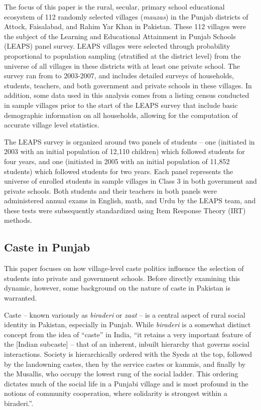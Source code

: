 \documentclass[Eubank_pk_ethnic_sorting.tex]{subfiles}
\begin{document}
The focus of this paper is the rural, secular, primary school educational ecosystem of 112 randomly selected villages (\emph{mauzas}) in the Punjab districts of Attock, Faisalabad, and Rahim Yar Khan in Pakistan. These 112 villages were the subject of the Learning and Educational Attainment in Punjab Schools (LEAPS) panel survey. LEAPS villages were selected through probability proportional to population sampling (stratified at the district level) from the universe of all villages in these districts with at least one private school. The survey ran from to 2003-2007, and includes detailed surveys of households, students, teachers, and both government and private schools in these villages. In addition, some data used in this analysis comes from a listing census conducted in sample villages prior to the start of the LEAPS survey that include basic demographic information on all households, allowing for the computation of accurate village level statistics.

The LEAPS survey is organized around two panels of students -- one (initiated in 2003 with an initial population of 12,110 children) which followed students for four years, and one (initiated in 2005 with an initial population of 11,852 students) which followed students for two years. Each panel represents the universe of enrolled students in sample villages in Class 3 in both government and private schools. Both students and their teachers in both panels were administered annual exams in English, math, and Urdu by the LEAPS team, and these tests were subsequently standardized using Item Response Theory (IRT) methods. 

\subsection{Caste in Punjab}\label{}

This paper focuses on how village-level caste politics influence the selection of students into private and government schools. Before directly examining this dynamic, however, some background on the nature of caste in Pakistan is warranted. 

Caste -- known variously as \emph{biraderi} or \emph{zaat} -- is a central aspect of rural social identity in Pakistan, especially in Punjab. While \emph{biraderi} is a somewhat distinct concept from the idea of ``caste'' in India, ``it retains a very important feature of the [Indian subcaste] -- that of an inherent, inbuilt hierarchy that governs social interactions. Society is hierarchically ordered with the Syeds at the top, followed by the landowning castes, then by the service castes or kammis, and finally by the Musallis, who occupy the lowest rung of the social ladder. This ordering dictates much of the social life in a Punjabi village and is most profound in the notions of community cooperation, where solidarity is strongest within a biraderi.''\citep[p. 29]{Gazdar:2007vt}. 
\end{document}
